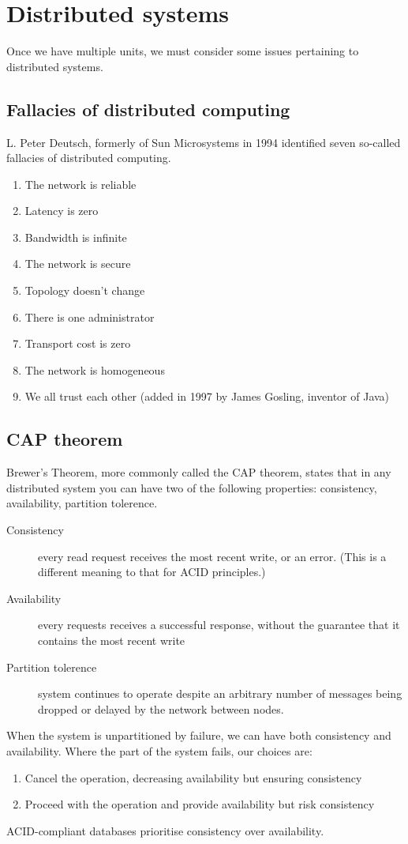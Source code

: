 \section{Distributed systems}

Once we have multiple units, we must consider some issues pertaining to distributed systems.

\subsection{Fallacies of distributed computing}

L. Peter Deutsch, formerly of Sun Microsystems in 1994 identified seven so-called fallacies of distributed computing.

\begin{enumerate}
\item The network is reliable
\item Latency is zero
\item Bandwidth is infinite
\item The network is secure
\item Topology doesn't change
\item There is one administrator
\item Transport cost is zero
\item The network is homogeneous
\item We all trust each other (added in 1997 by James Gosling, inventor of Java)
\end{enumerate}

\subsection{CAP theorem}

Brewer's Theorem, more commonly called the CAP theorem, states that in any distributed system you can have two of the following properties: consistency, availability, partition tolerence. 
\begin{description}
\item[Consistency] every read request receives the most recent write, or an error. (This is a different meaning to that for ACID principles.)
\item[Availability] every requests receives a successful response, without the guarantee that it contains the most recent write
\item[Partition tolerence] system continues to operate despite an arbitrary number of messages being dropped or delayed by the network between nodes. 
\end{description}
When the system is unpartitioned by failure, we can have both consistency and availability.
Where the part of the system fails, our choices are:
\begin{enumerate}
\item Cancel the operation, decreasing availability but ensuring consistency
\item Proceed with the operation and provide availability but risk consistency
\end{enumerate}
ACID-compliant databases prioritise consistency over availability.

